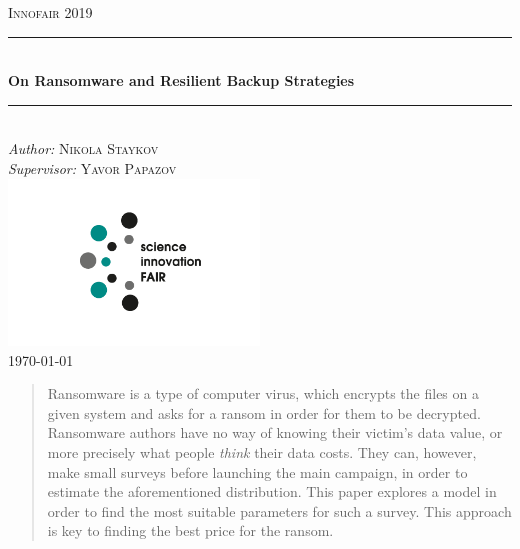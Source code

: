 \documentclass[11pt, a4paper]{article}
\theoremstyle{definition}
\begin{document}
\begin{titlepage}
	\newcommand{\HRule}{\rule{\linewidth}{0.5mm}}
	\centering
	\textsc{\LARGE Innofair 2019}\\[1cm]
	\HRule\\[1 cm]
	{\huge\bfseries On Ransomware and Resilient Backup Strategies}\\[0.5 cm] 
	\HRule\\
			\vfill
			\Large
			\textit{Author:}
			\textsc{Nikola Staykov}\\
            \vspace{2cm}
			\Large
			\textit{Supervisor:}
            \textsc{Yavor Papazov}\\
            \includegraphics[width=0.5\textwidth]{Innofair_logo}\\
    \vfill	
	{\large\today}   
	\vfill
\end{titlepage}

\tableofcontents
\newpage
\begin{abstract}
		Ransomware is a type of computer virus, which encrypts the files on a given system and asks for a ransom in order for them to be decrypted. Ransomware authors have no way of knowing their victim's data value, or more precisely what people \textit{think} their data costs. They can, however, make small surveys before launching the main campaign, in order to estimate the aforementioned distribution. This paper explores a model in order to find the most suitable parameters for such a survey. This approach is key to finding the best price for the ransom.
\end{abstract}
\end{document}
